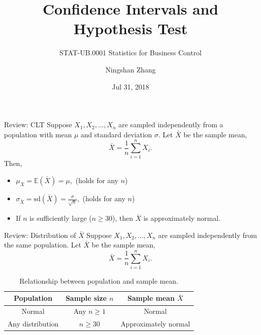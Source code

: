 \documentclass{beamer}
\title{Confidence Intervals and Hypothesis Test}
\subtitle{STAT-UB.0001 Statistics for Business Control}
\author{Ningshan Zhang}
\institute[New York University] %
{
  IOMS Department\\
  nzhang@stern.nyu.edu
  \let\thefootnote\relax\footnotetext{\tiny{*  Office Hours: Wed \& Fri 10:00 - 11:30 AM, KMC 8-174}}
}
\date{Jul 31, 2018}
\newcommand{\E}{\mathbb{E}}
\newcommand{\sd}{\text{sd}}
\let\thefootnote\relax\footnotetext{\tiny{*  Office Hours: Wed \& Fri 10:00 - 11:30 AM, KMC 8-174}}
\begin{document}
\begin{frame}
  \titlepage
\end{frame}


\begin{frame}{Review: CLT}
    Suppose $X_1,X_2,\dots,X_n$ are sampled independently from a population with mean $\mu$ and 
    standard deviation $\sigma$. Let $\bar X$ be the sample mean, 
    $$\bar X = \frac{1}{n} \sum_{i=1}^n X_i.$$
    Then,
    \begin{itemize}
        \item  $\mu_{\bar X}= \E(\bar X) = \mu$, \,\alert{(holds for any $n$)}
        \item $\sigma_{\bar X} =\sd(\bar X) =  \frac{\sigma}{\sqrt{n}}$, \,\alert{(holds for any $n$)}
        \item  If $n$ is sufficiently large \alert{($n\geq 30$)}, then $\bar X$ is approximately normal.
    \end{itemize}

\end{frame}

\begin{frame}{Review: Distribution of $\bar X$}
    Suppose $X_1,X_2,\dots,X_n$ are sampled independently from the same population.
    Let $\bar X$ be the sample mean, $$\bar X = \frac{1}{n} \sum_{i=1}^n X_i.$$

 \begin{table}\caption{Relationship between population and sample mean.}
        \begin{center}
            \begin{tabular}{|c|c|c|}
                \hline
                \textbf{Population} & \textbf{Sample size $n$} & \textbf{Sample mean $\bar X$} \\\hline
                Normal & Any $n\geq 1$ & Normal \\\hline
                Any distribution & $n\geq 30$ & Approximately normal \\\hline
            \end{tabular}
        \end{center}\end{table}

\let\thefootnote\relax{}
\end{frame}
\end{document}
